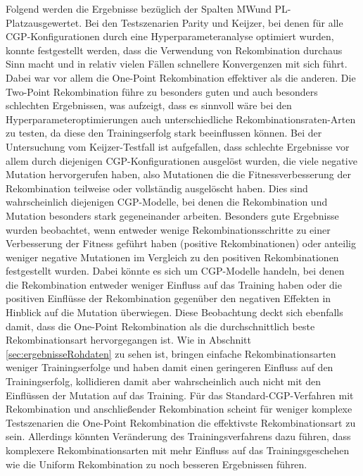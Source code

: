 Folgend werden die Ergebnisse bezüglich der Spalten \glqq MW\grqq\space und \glqq PL-Platz\grqq\space ausgewertet.
Bei den Testszenarien Parity und Keijzer, bei denen für alle CGP-Konfigurationen durch eine Hyperparameteranalyse optimiert wurden, konnte festgestellt werden, dass die Verwendung von Rekombination durchaus Sinn macht und in relativ vielen Fällen schnellere Konvergenzen mit sich führt.
Dabei war vor allem die One-Point Rekombination effektiver als die anderen.
Die Two-Point Rekombination führe zu besonders guten und auch besonders schlechten Ergebnissen, was aufzeigt, dass es sinnvoll wäre bei den Hyperparameteroptimierungen auch unterschiedliche Rekombinationsraten-Arten zu testen, da diese den Trainingserfolg stark beeinflussen können.
Bei der Untersuchung vom Keijzer-Testfall ist aufgefallen, dass schlechte Ergebnisse vor allem durch diejenigen CGP-Konfigurationen ausgelöst wurden, die viele negative Mutation hervorgerufen haben, also Mutationen die die Fitnessverbesserung der Rekombination teilweise oder vollständig ausgelöscht haben.
Dies sind wahrscheinlich diejenigen CGP-Modelle, bei denen die Rekombination und Mutation besonders stark gegeneinander arbeiten.
Besonders gute Ergebnisse wurden beobachtet, wenn entweder wenige Rekombinationsschritte zu einer Verbesserung der Fitness geführt haben (positive Rekombinationen) oder anteilig weniger negative Mutationen im Vergleich zu den positiven Rekombinationen festgestellt wurden.
Dabei könnte es sich um CGP-Modelle handeln, bei denen die Rekombination entweder weniger Einfluss auf das Training haben oder die positiven Einflüsse der Rekombination gegenüber den negativen Effekten in Hinblick auf die Mutation überwiegen.
Diese Beobachtung deckt sich ebenfalls damit, dass die One-Point Rekombination als die durchschnittlich beste Rekombinationsart hervorgegangen ist.
Wie in Abschnitt \ref{sec:ergebnisseRohdaten} zu sehen ist, bringen einfache Rekombinationsarten weniger Trainingserfolge und haben damit einen geringeren Einfluss auf den Trainingserfolg, kollidieren damit aber wahrscheinlich auch nicht mit den Einflüssen der Mutation auf das Training.
Für das Standard-CGP-Verfahren mit Rekombination und anschließender Rekombination scheint für weniger komplexe Testszenarien die One-Point Rekombination die effektivste Rekombinationsart zu sein.
Allerdings könnten Veränderung des Trainingsverfahrens dazu führen, dass komplexere Rekombinationsarten mit mehr Einfluss auf das Trainingsgeschehen wie die Uniform Rekombination zu noch besseren Ergebnissen führen.\\
